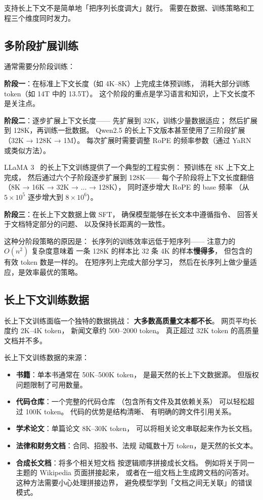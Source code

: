 支持长上下文不是简单地「把序列长度调大」就行。
需要在数据、训练策略和工程三个维度同时发力。

\subsection{多阶段扩展训练}

通常需要分阶段训练：

\textbf{阶段一}：在标准上下文长度（如 4K--8K）上完成主体预训练，
消耗大部分训练 token（如 14T 中的 13.5T）。
这个阶段的重点是学习语言和知识，上下文长度不是关注点。

\textbf{阶段二}：逐步扩展上下文长度——
先扩展到 32K，训练少量数据适应；
然后扩展到 128K，再训练一批数据。
Qwen2.5 的长上下文版本甚至使用了三阶段扩展（32K → 128K → 1M）。
每次扩展时需要调整 RoPE 的频率参数（通过 YaRN 或类似方法）。

LLaMA 3~\cite{dubey2024llama3} 的长上下文训练提供了一个典型的工程实例：
预训练在 8K 上下文上完成，
然后通过六个子阶段逐步扩展到 128K——
每个子阶段将上下文长度翻倍（8K → 16K → 32K → ... → 128K），
同时逐步增大 RoPE 的 base 频率
（从 $5 \times 10^5$ 逐步增大到 $8 \times 10^6$）。

\textbf{阶段三}：在长上下文数据上做 SFT，
确保模型能够在长文本中遵循指令、
回答关于文档特定部分的问题、
以及保持长距离的一致性。

这种分阶段策略的原因是：
长序列的训练效率远低于短序列——
注意力的 $O(n^2)$ 复杂度意味着
一条 128K 的样本比 32 条 4K 的样本\textbf{慢得多}，
但包含的有效 token 数是一样的。
在短序列上完成大部分学习，
然后在长序列上做少量适应，是效率最优的策略。

\subsection{长上下文训练数据}

长上下文训练面临一个独特的数据挑战：
\textbf{大多数高质量文本都不长}。
网页平均长度约 2K--4K token，
新闻文章约 500--2000 token。
真正超过 32K token 的高质量文档并不多。

长上下文训练数据的来源：
\begin{itemize}[noitemsep]
  \item \textbf{书籍}：单本书通常在 50K--500K token，
        是最天然的长上下文数据源。
        但版权问题限制了可用数量。
  \item \textbf{代码仓库}：一个完整的代码仓库
        （包含所有文件及其依赖关系）
        可以轻松超过 100K token。
        代码的优势是结构清晰、
        有明确的跨文件引用关系。
  \item \textbf{学术论文}：单篇论文 8K--30K token，
        可以将相关论文串联起来作为长文档。
  \item \textbf{法律和财务文档}：合同、招股书、法规
        动辄数十万 token，是天然的长文本。
  \item \textbf{合成长文档}：将多个相关短文档
        按逻辑顺序拼接成长文档。
        例如将关于同一主题的 Wikipedia 页面拼接起来，
        或者在一组文档上生成跨文档的问答对。
        这种方法需要小心处理拼接边界，
        避免模型学到「文档之间无关联」的错误模式。
\end{itemize}

